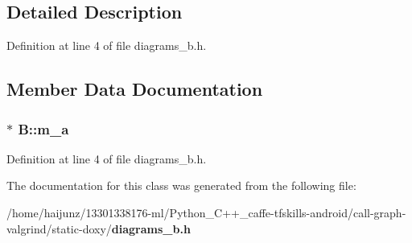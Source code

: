 \subsection{Detailed Description}


Definition at line 4 of file diagrams\-\_\-b.\-h.



\subsection{Member Data Documentation}
\subsubsection[{m\-\_\-a}]{$\ast$ B\-::m\-\_\-a}\label{class_b_a26c70b64fe7cf17fcced7755ecff7537}


Definition at line 4 of file diagrams\-\_\-b.\-h.



The documentation for this class was generated from the following file\-:\begin{DoxyCompactItemize}
\item 
/home/haijunz/13301338176-\/ml/\-Python\-\_\-\-C++\-\_\-caffe-\/tfskills-\/android/call-\/graph-\/valgrind/static-\/doxy/{\bf diagrams\-\_\-b.\-h}\end{DoxyCompactItemize}
